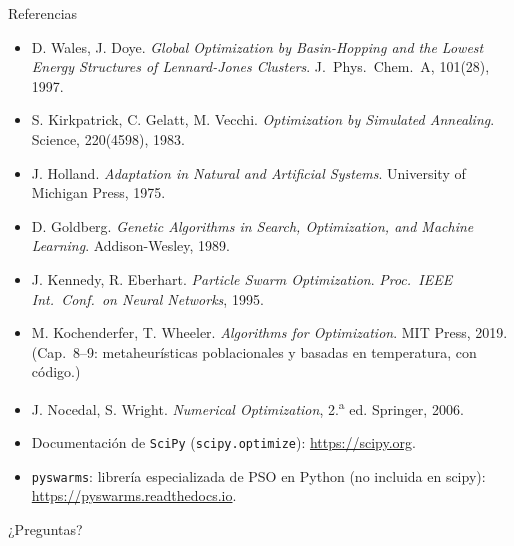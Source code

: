 \documentclass[aspectratio=169,10pt]{beamer}
\begin{document}
\begin{frame}{Referencias}
  \footnotesize
  \begin{itemize}
    \item D. Wales, J. Doye. \emph{Global Optimization by Basin-Hopping and
      the Lowest Energy Structures of Lennard-Jones Clusters}.
      J.\ Phys.\ Chem.\ A, 101(28), 1997.
    \item S. Kirkpatrick, C. Gelatt, M. Vecchi. \emph{Optimization by
      Simulated Annealing}. Science, 220(4598), 1983.
    \item J. Holland. \emph{Adaptation in Natural and Artificial
      Systems}. University of Michigan Press, 1975.
    \item D. Goldberg. \emph{Genetic Algorithms in Search, Optimization,
      and Machine Learning}. Addison-Wesley, 1989.
    \item J. Kennedy, R. Eberhart. \emph{Particle Swarm Optimization}.
      \emph{Proc.\ IEEE Int.\ Conf.\ on Neural Networks}, 1995.
    \item M. Kochenderfer, T. Wheeler. \emph{Algorithms for
      Optimization}. MIT Press, 2019. (Cap.\ 8--9: metaheurísticas
      poblacionales y basadas en temperatura, con código.)
    \item J. Nocedal, S. Wright. \emph{Numerical Optimization}, 2.\textsuperscript{a}
      ed. Springer, 2006.
    \item Documentación de \texttt{SciPy} (\texttt{scipy.optimize}):
      \url{https://scipy.org}.
    \item \texttt{pyswarms}: librería especializada de PSO en Python
      (no incluida en scipy): \url{https://pyswarms.readthedocs.io}.
  \end{itemize}
\end{frame}

\begin{frame}[standout]
  ¿Preguntas?
\end{frame}
\end{document}
